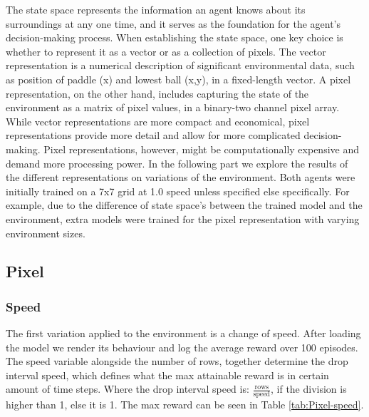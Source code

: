 \documentclass{article}
\begin{document}
    The state space represents the information an agent knows about its surroundings at any one time, and it serves as the foundation for the agent's decision-making process. 
    When establishing the state space, one key choice is whether to represent it as a vector or as a collection of pixels.
    The vector representation is a numerical description of significant environmental data, such as position of paddle (x) and lowest ball (x,y), in a fixed-length vector.
    A pixel representation, on the other hand, includes capturing the state of the environment as a matrix of pixel values, in a binary-two channel pixel array.
    While vector representations are more compact and economical, pixel representations provide more detail and allow for more complicated decision-making.
    Pixel representations, however, might be computationally expensive and demand more processing power.
    In the following part we explore the results of the different representations on variations of the environment.
    Both agents were initially trained on a 7x7 grid at 1.0 speed unless specified else specifically.
    For example, due to the difference of state space's between the trained model and the environment, extra models were trained for the pixel representation with varying environment sizes.
    
    \subsection{Pixel}
    \label{ENV-PV}
    
    \subsubsection{Speed}
    The first variation applied to the environment is a change of speed.
    After loading the model we render its behaviour and log the average reward over 100 episodes. 
    The speed variable alongside the number of rows, together determine the drop interval speed, which defines what the max attainable reward is in certain amount of time steps. 
    Where the drop interval speed is: $\frac{\text{rows}}{\text{speed}}$, if the division is higher than 1, else it is 1. 
    The max reward can be seen in Table \ref{tab:Pixel-speed}. 
    
\end{document}
